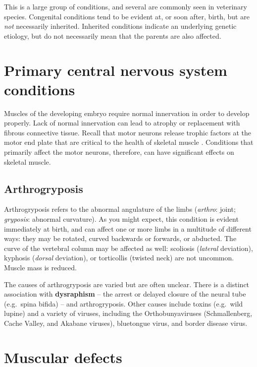 \documentclass[openany]{book}
\begin{document}
This is a large group of conditions, and several are commonly seen in
veterinary species. Congenital conditions tend to be evident at, or soon
after, birth, but are \emph{not} necessarily inherited. Inherited
conditions indicate an underlying genetic etiology, but do not
necessarily mean that the parents are also affected.

\section{Primary central nervous system
conditions}\label{primary-central-nervous-system-conditions}

Muscles of the developing embryo require normal innervation in order to
develop properly. Lack of normal innervation can lead to atrophy or
replacement with fibrous connective tissue. Recall that motor neurons
release trophic factors at the motor end plate that are critical to the
health of skeletal muscle . Conditions that primarily affect the motor
neurons, therefore, can have significant effects on skeletal muscle.

\subsection{Arthrogryposis}\label{arthrogryposis}

Arthrogryposis refers to the abnormal angulature of the limbs
(\emph{arthro}: joint; \emph{gryposis}: abnormal curvature). As you
might expect, this condition is evident immediately at birth, and can
affect one or more limbs in a multitude of different ways: they may be
rotated, curved backwards or forwards, or abducted. The curve of the
vertebral column may be affected as well: scoliosis (\emph{lateral}
deviation), kyphosis (\emph{dorsal} deviation), or torticollis (twisted
neck) are not uncommon. Muscle mass is reduced.

The causes of arthrogryposis are varied but are often unclear. There is
a distinct association with \textbf{dysraphism} -- the arrest or delayed
closure of the neural tube (e.g.~spina bifida) -- and arthrogryposis.
Other causes include toxins (e.g.~wild lupine) and a variety of viruses,
including the Orthobunyaviruses (Schmallenberg, Cache Valley, and
Akabane viruses), bluetongue virus, and border disease virus.

\section{Muscular defects}\label{muscular-defects}
\end{document}
